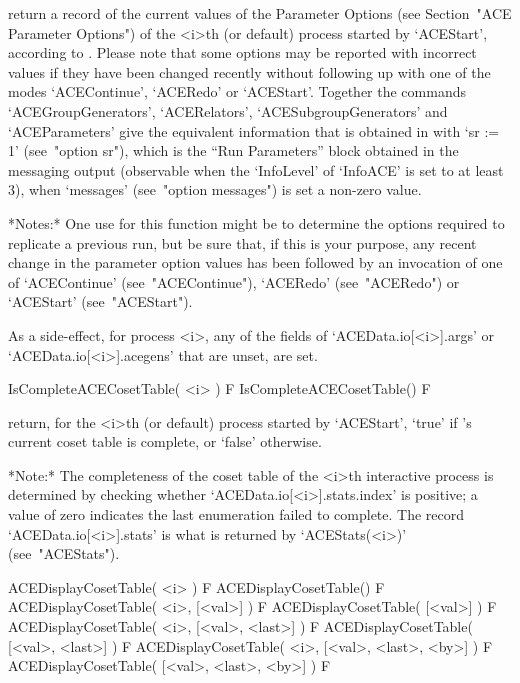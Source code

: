 return a record of the current values of the {\ACE} Parameter  Options
(see Section~"ACE  Parameter  Options")  of  the  <i>th  (or  default)
process started by `ACEStart', according to {\ACE}. Please  note  that
some options may be reported with incorrect values if they  have  been
changed  recently  without  following  up  with  one  of   the   modes
`ACEContinue',  `ACERedo'  or  `ACEStart'.   Together   the   commands
`ACEGroupGenerators',   `ACERelators',   `ACESubgroupGenerators'   and
`ACEParameters'  give  the  equivalent  {\GAP}  information  that   is
obtained in {\ACE} with `sr := 1'  (see~"option  sr"),  which  is  the
``Run Parameters'' block obtained in the messaging output  (observable
when the `InfoLevel'  of  `InfoACE'  is  set  to  at  least  3),  when
`messages' (see~"option messages") is set a non-zero value.

*Notes:*
One use for this function might be to determine the  options  required
to replicate a previous run,  but  be  sure  that,  if  this  is  your
purpose, any recent change in the parameter  option  values  has  been
followed by an invocation of one of `ACEContinue' (see~"ACEContinue"),
`ACERedo' (see~"ACERedo") or `ACEStart' (see~"ACEStart").

As a side-effect, for  {\ACE}  process  <i>,  any  of  the  fields  of
`ACEData.io[<i>].args' or `ACEData.io[<i>].acegens'  that  are  unset,
are set.

\>IsCompleteACECosetTable( <i> ) F
\>IsCompleteACECosetTable() F

return, for the <i>th (or  default)  process  started  by  `ACEStart',
`true' if  {\ACE}'s  current  coset  table  is  complete,  or  `false'
otherwise.

*Note:*
The completeness of the coset table of the  <i>th  interactive  {\ACE}
process      is       determined       by       checking       whether
`ACEData.io[<i>].stats.index' is positive; a value of  zero  indicates
the   last   enumeration    failed    to    complete.    The    record
`ACEData.io[<i>].stats'  is  what  is  returned   by   `ACEStats(<i>)'
(see~"ACEStats").

\>ACEDisplayCosetTable( <i> ) F
\>ACEDisplayCosetTable() F
\>ACEDisplayCosetTable( <i>, [<val>] ) F
\>ACEDisplayCosetTable( [<val>] ) F
\>ACEDisplayCosetTable( <i>, [<val>, <last>] ) F
\>ACEDisplayCosetTable( [<val>, <last>] ) F
\>ACEDisplayCosetTable( <i>, [<val>, <last>, <by>] ) F
\>ACEDisplayCosetTable( [<val>, <last>, <by>] ) F

